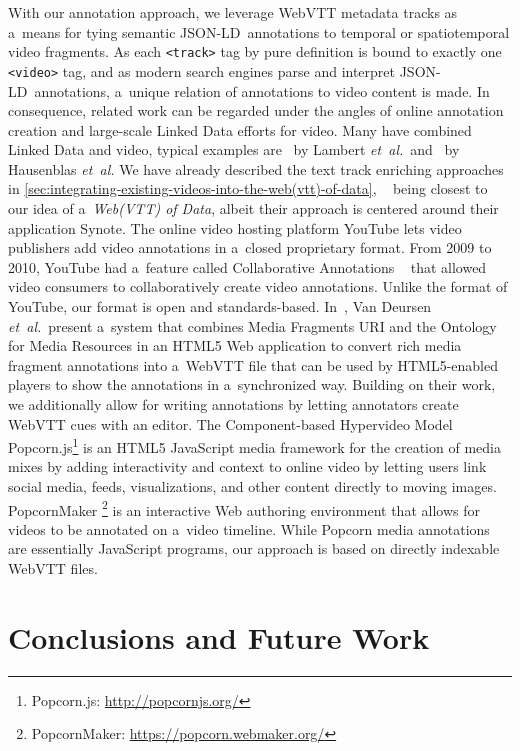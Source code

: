 \documentclass{sig-alternate-ceur}
\newcommand{\inlinelistingsize}{\fontsize{8pt}{11pt}}
\let\oldurl\url
\renewcommand{\url}[1]{\inlinelistingsize\oldurl{#1}}
\def\JSONLD{\mbox{JSON-LD}}
\begin{document}
With our annotation approach, we leverage WebVTT
me\-tadata tracks as a~means for tying semantic \JSONLD\ annotations
to temporal or spatiotemporal video fragments.
As each \texttt{<track>} tag by pure definition is bound to
exactly one \texttt{<video>} tag, and as modern search engines
parse and interpret \JSONLD\ annotations,
a~unique relation of annotations to video content is made.
In consequence, related work can be regarded under the angles
of online annotation creation and large-scale Linked Data 
efforts for video.
Many have combined Linked Data and video,
typical examples are~\cite{lambert2010linkeddata} by Lambert \emph{et~al.}\
and~\cite{hausenblas2009im} by Hausenblas \emph{et~al.}
We have already described the text track enriching approaches~\cite{li2013enriching,li2012creating,yi2012synote,steiner2010semwebvid}
in \autoref{sec:integrating-existing-videos-into-the-web(vtt)-of-data},%
~\cite{yi2012synote} being closest to our idea of a~\emph{Web(VTT) of Data},
albeit their approach is centered around their application Synote.
The online video hosting platform YouTube
lets video publishers add video annotations
in a~closed proprietary format.
From 2009 to 2010, YouTube had a~feature called
Collaborative Annotations%
~\cite{fink2009collaborativeannotations}
that allowed video consumers to collaboratively
create video annotations.
Unlike the format of YouTube, our format is open and standards-based.
In~\cite{vandeursen2012mediafragmentannotations},
Van Deursen \emph{et~al.}\ present a~system
that combines Media Fragments URI
and the Ontology for Media Resources
in an HTML5
Web application to convert rich media fragment annotations
into a~WebVTT file
that can be used by HTML5-enabled players
to show the annotations in a~synchronized way.
Building on their work,
we additionally allow for writing annotations by
letting annotators create WebVTT cues with an editor.
The Component-based Hypervideo Model
Popcorn.js\footnote{Popcorn.js: \url{http://popcornjs.org/}}
is an HTML5 JavaScript media framework
for the creation of media mixes
by adding interactivity and context to online video
by letting users link social media, feeds,
visualizations, and other content directly to moving images.
PopcornMaker%
\footnote{PopcornMaker: \url{https://popcorn.webmaker.org/}}
is an interactive Web authoring environment
that allows for videos to be annotated on a~video timeline.
While Popcorn media annotations are essentially JavaScript programs,
our approach is based on directly indexable WebVTT files.

\section{Conclusions and Future Work}
\label{sec:conclusions-and-future-work}
\end{document}
